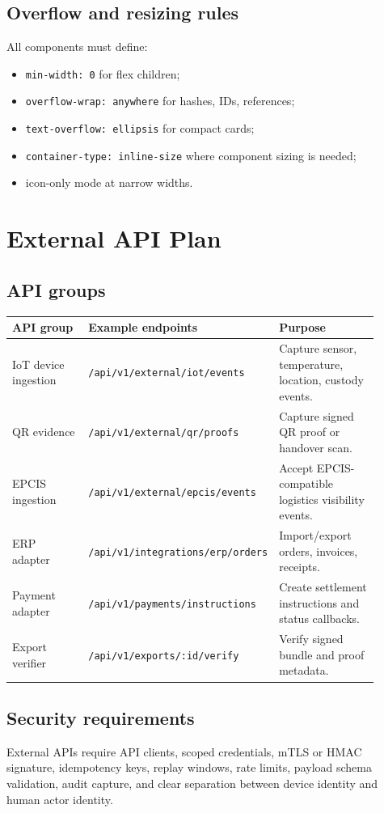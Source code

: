 \documentclass[11pt]{article}
\newcommand{\code}[1]{\texttt{#1}}
\begin{document}
\subsection{Overflow and resizing rules}
All components must define:
\begin{itemize}
  \item \code{min-width: 0} for flex children;
  \item \code{overflow-wrap: anywhere} for hashes, IDs, references;
  \item \code{text-overflow: ellipsis} for compact cards;
  \item \code{container-type: inline-size} where component sizing is needed;
  \item icon-only mode at narrow widths.
\end{itemize}

\section{External API Plan}

\subsection{API groups}
\begin{longtable}{p{0.27\linewidth}p{0.31\linewidth}p{0.32\linewidth}}
\toprule
API group & Example endpoints & Purpose \\
\midrule
IoT device ingestion & \code{/api/v1/external/iot/events} & Capture sensor, temperature, location, custody events. \\
QR evidence & \code{/api/v1/external/qr/proofs} & Capture signed QR proof or handover scan. \\
EPCIS ingestion & \code{/api/v1/external/epcis/events} & Accept EPCIS-compatible logistics visibility events. \\
ERP adapter & \code{/api/v1/integrations/erp/orders} & Import/export orders, invoices, receipts. \\
Payment adapter & \code{/api/v1/payments/instructions} & Create settlement instructions and status callbacks. \\
Export verifier & \code{/api/v1/exports/:id/verify} & Verify signed bundle and proof metadata. \\
\bottomrule
\end{longtable}

\subsection{Security requirements}
External APIs require API clients, scoped credentials, mTLS or HMAC signature, idempotency keys, replay windows, rate limits, payload schema validation, audit capture, and clear separation between device identity and human actor identity.
\end{document}
